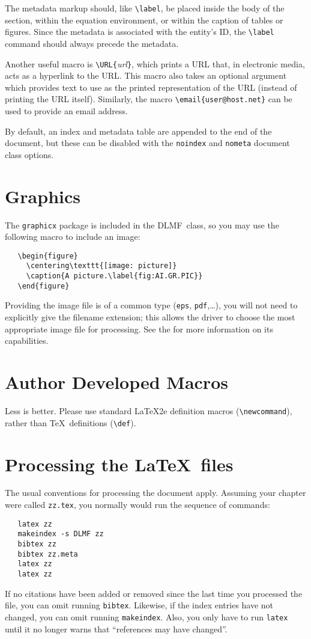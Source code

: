 \documentclass[twoside]{article}
\newcommand{\DLMF}{{\sc DLMF}}
\newcommand{\package}[1]{\texttt{#1}}
\newcommand{\token}[1]{\texttt{#1}}
\begin{document}
The metadata markup should, like \verb|\label|, be placed inside
the body of the section, within the equation environment, or within
the caption of tables or figures.  Since the metadata is associated
with the entity's ID, the \verb|\label| command should always precede the
metadata.

Another useful macro is \verb|\URL{|\textit{url}\verb|}|, which prints
a URL that, in electronic media, acts as a hyperlink to the URL.  This
macro also takes an optional argument which provides text to use as the
printed representation of the URL (instead of printing the URL itself).
Similarly, the macro \verb|\email{user@host.net}| can be used to provide an email
address.

By default, an index and metadata table are appended to the end
of the document, but these can be disabled with the \token{noindex}
and \token{nometa} document class options.

\section{Graphics}\label{sec:graphics}
The \package{graphicx} package is included in the \DLMF\ class, so
you may use the following macro to include an image:
\begin{verbatim}
   \begin{figure}
     \centering\texttt{[image: picture]}
     \caption{A picture.\label{fig:AI.GR.PIC}}
   \end{figure}
\end{verbatim}
Providing the image file is of a common type (\texttt{eps}, \texttt{pdf},\ldots),
you  will not need to explicitly give the filename extension;  this allows the
driver to choose the most appropriate image file for processing.
See the \cite{Goossens:1997:LGC} for more information on its capabilities.

\section{Author Developed Macros}
Less is better.  Please use standard \LaTeX2e definition macros (\verb|\newcommand|),
rather than \TeX\ definitions (\verb|\def|).

\section{Processing the \LaTeX\ files}
The usual conventions for processing the document apply.  Assuming your chapter
were called \token{zz.tex}, you normally would run the sequence of commands:
\begin{verbatim}
   latex zz
   makeindex -s DLMF zz
   bibtex zz
   bibtex zz.meta
   latex zz
   latex zz
\end{verbatim}
If no citations have been added or removed since the last time you processed 
the file, you can omit running \token{bibtex}.  Likewise, if the index entries
have not changed, you can omit running \token{makeindex}.
Also, you only have to run \texttt{latex} until it no longer warns that
``references may have changed''.  
\end{document}
